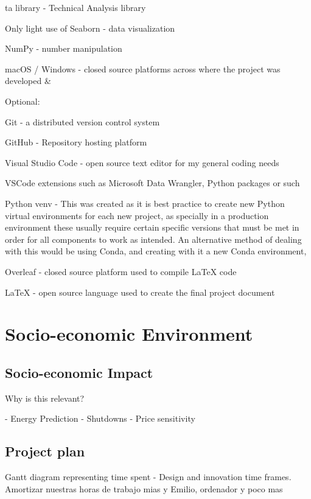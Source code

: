 \documentclass[12pt]{report} %
\begin{document}
ta library - Technical Analysis library\cite{ta-lib}

Only light use of Seaborn - data visualization \cite{seaborn}

NumPy - number manipulation \cite{numpy}

macOS / Windows - closed source platforms across where the project was developed \cite{macos} \& \cite{windows}

Optional:

Git - a distributed version control system \cite{git}

GitHub - Repository hosting platform \cite{github}

Visual Studio Code - open source text editor for my general coding needs \cite{vscode}

VSCode extensions such as Microsoft Data Wrangler, Python packages or such

Python venv - This was created as it is best practice to create new Python virtual environments for each new project, as specially in a production environment these usually require certain specific versions that must be met in order for all components to work as intended. An alternative method of dealing with this would be using Conda, and creating with it a new Conda environment, \cite{python_venv}


Overleaf - closed source platform used to compile LaTeX code \cite{overleaf}

LaTeX - open source language used to create the final project document \cite{latex}






\chapter{Socio-economic Environment}
\section{Socio-economic Impact}
Why is this relevant?

- Energy Prediction
- Shutdowns
- Price sensitivity

\section{Project plan}
Gantt diagram representing time spent - Design and innovation time frames. Amortizar nuestras horas de trabajo mias y Emilio, ordenador y poco mas
\end{document}
